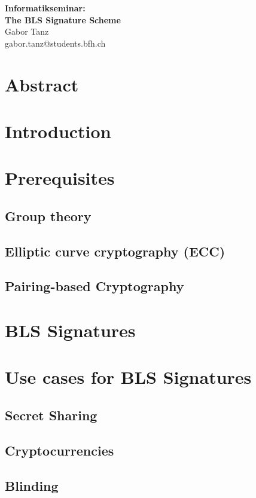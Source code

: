 \documentclass[a4paper,12pt]{scrartcl}
\begin{document}
\begin{titlepage}
\begin{center}
\vspace*{3cm}
\vspace{1cm}
\Huge \textbf{Informatikseminar: \\ The BLS Signature Scheme} \\
\vspace{6cm}
\vspace{1cm}
\large Gabor Tanz \\ gabor.tanz@students.bfh.ch \\
\end{center}
\end{titlepage}

\tableofcontents
\pagebreak

\section{Abstract}
\pagebreak

\section{Introduction}
\pagebreak

\section{Prerequisites}
\subsection{Group theory}
\subsection{Elliptic curve cryptography (ECC)}
\subsection{Pairing-based Cryptography}
\pagebreak

\section{BLS Signatures}
\pagebreak

\section{Use cases for BLS Signatures}
\subsection{Secret Sharing}
\subsection{Cryptocurrencies}
\subsection{Blinding}
\pagebreak
\end{document}
